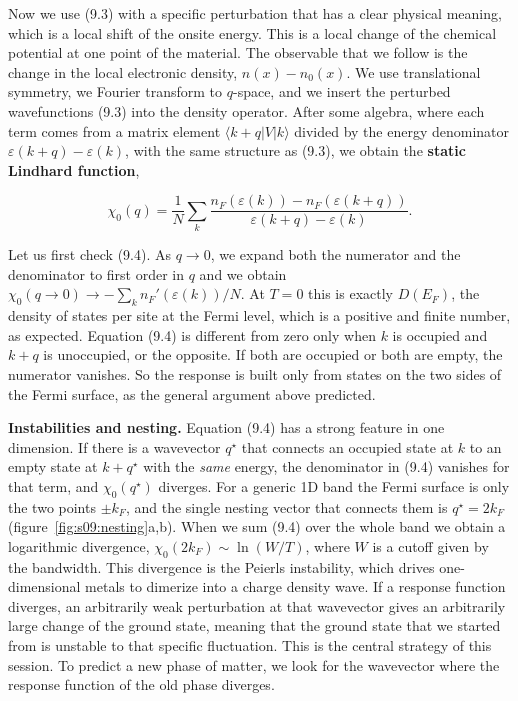 Now we use (9.3) with a specific perturbation that has a clear physical meaning, which is a local
shift of the onsite energy. This is a local change of the chemical potential at one point of the
material. The observable that we follow is the change in the local electronic density,
$n(x) - n_0(x)$. We use translational symmetry, we Fourier transform to $q$-space, and we insert the
perturbed wavefunctions (9.3) into the density operator. After some algebra, where each term comes
from a matrix element $\langle k+q|V|k\rangle$ divided by the energy denominator
$\varepsilon(k+q)-\varepsilon(k)$, with the same structure as (9.3), we obtain the \textbf{static
Lindhard function},

\begin{equation}
\chi_0(q) = \frac{1}{N} \sum_k \frac{n_F(\varepsilon(k)) - n_F(\varepsilon(k+q))}{\varepsilon(k+q) - \varepsilon(k)}.
\end{equation}

Let us first check (9.4). As $q\to 0$, we expand both the
numerator and the denominator to first order in $q$ and we obtain
$\chi_0(q\to 0) \to -\sum_k n_F'(\varepsilon(k))/N$. At $T=0$ this is exactly $D(E_F)$, the density
of states per site at the Fermi level, which is a positive and finite number, as expected. Equation
(9.4) is different from zero only when $k$ is occupied and $k+q$ is unoccupied, or the opposite. If
both are occupied or both are empty, the numerator vanishes. So the response is built only from
states on the two sides of the Fermi surface, as the general argument above predicted.

\textbf{Instabilities and nesting.} Equation (9.4) has a strong feature in one dimension. If there is
a wavevector $q^\star$ that connects an occupied state at $k$ to an empty state at $k+q^\star$ with
the \emph{same} energy, the denominator in (9.4) vanishes for that term, and $\chi_0(q^\star)$
diverges. For a generic 1D band the Fermi surface is only the two points $\pm k_F$, and the single
nesting vector that connects them is $q^\star = 2k_F$ (figure~\ref{fig:s09:nesting}a,b). When we sum
(9.4) over the whole band we obtain a logarithmic divergence, $\chi_0(2k_F) \sim \ln(W/T)$, where $W$
is a cutoff given by the bandwidth. This divergence is the Peierls instability, which drives
one-dimensional metals to dimerize into a charge density wave. If a response function diverges, an arbitrarily weak perturbation at that wavevector gives an
arbitrarily large change of the ground state, meaning that the ground state that we started from is
unstable to that specific fluctuation. This is the central strategy of this session. To predict a new phase of matter, we look for the wavevector where the response function of the old
phase diverges.

